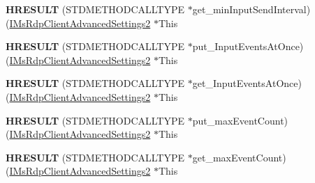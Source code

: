 \begin{DoxyCompactItemize}
\item 
\mbox{\label{struct_m_s_t_s_c_lib_1_1_i_ms_rdp_client_advanced_settings2_vtbl_a6a60914d642807185ff1da01727cd9e5}} 
{\bfseries H\+R\+E\+S\+U\+LT} (S\+T\+D\+M\+E\+T\+H\+O\+D\+C\+A\+L\+L\+T\+Y\+PE $\ast$get\+\_\+min\+Input\+Send\+Interval)(\hyperlink{interface_m_s_t_s_c_lib_1_1_i_ms_rdp_client_advanced_settings2}{I\+Ms\+Rdp\+Client\+Advanced\+Settings2} $\ast$This
\item 
\mbox{\label{struct_m_s_t_s_c_lib_1_1_i_ms_rdp_client_advanced_settings2_vtbl_af3c9ce71b8ab1eb40365a5cd7caa4dd4}} 
{\bfseries H\+R\+E\+S\+U\+LT} (S\+T\+D\+M\+E\+T\+H\+O\+D\+C\+A\+L\+L\+T\+Y\+PE $\ast$put\+\_\+\+Input\+Events\+At\+Once)(\hyperlink{interface_m_s_t_s_c_lib_1_1_i_ms_rdp_client_advanced_settings2}{I\+Ms\+Rdp\+Client\+Advanced\+Settings2} $\ast$This
\item 
\mbox{\label{struct_m_s_t_s_c_lib_1_1_i_ms_rdp_client_advanced_settings2_vtbl_a8fa9b683cb9a492ae0a4c07adfd8eb6b}} 
{\bfseries H\+R\+E\+S\+U\+LT} (S\+T\+D\+M\+E\+T\+H\+O\+D\+C\+A\+L\+L\+T\+Y\+PE $\ast$get\+\_\+\+Input\+Events\+At\+Once)(\hyperlink{interface_m_s_t_s_c_lib_1_1_i_ms_rdp_client_advanced_settings2}{I\+Ms\+Rdp\+Client\+Advanced\+Settings2} $\ast$This
\item 
\mbox{\label{struct_m_s_t_s_c_lib_1_1_i_ms_rdp_client_advanced_settings2_vtbl_a63ddc188fc32803c9c16064cbcb05a31}} 
{\bfseries H\+R\+E\+S\+U\+LT} (S\+T\+D\+M\+E\+T\+H\+O\+D\+C\+A\+L\+L\+T\+Y\+PE $\ast$put\+\_\+max\+Event\+Count)(\hyperlink{interface_m_s_t_s_c_lib_1_1_i_ms_rdp_client_advanced_settings2}{I\+Ms\+Rdp\+Client\+Advanced\+Settings2} $\ast$This
\item 
\mbox{\label{struct_m_s_t_s_c_lib_1_1_i_ms_rdp_client_advanced_settings2_vtbl_addd423081d66b5c0e3e0c403fa3c95fb}} 
{\bfseries H\+R\+E\+S\+U\+LT} (S\+T\+D\+M\+E\+T\+H\+O\+D\+C\+A\+L\+L\+T\+Y\+PE $\ast$get\+\_\+max\+Event\+Count)(\hyperlink{interface_m_s_t_s_c_lib_1_1_i_ms_rdp_client_advanced_settings2}{I\+Ms\+Rdp\+Client\+Advanced\+Settings2} $\ast$This
\item 

\end{DoxyCompactItemize}

